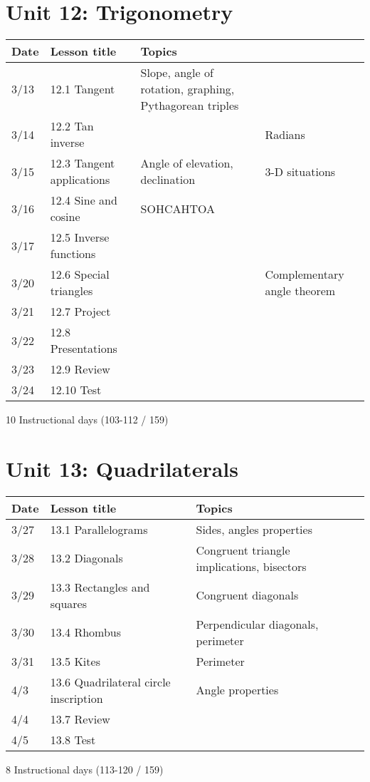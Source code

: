 \section*{Unit 12: Trigonometry}
\begin{tabular}{|p{0.9cm}|p{4cm}|p{7cm}|p{5cm}|}
  \hline
  Date & Lesson title & Topics  &  \\
  \hline
  3/13 & 12.1 Tangent & Slope, angle of rotation, graphing, Pythagorean triples &  \\
  \hline
  3/14 & 12.2 Tan inverse &  & Radians \\
  \hline
  3/15 & 12.3 Tangent applications & Angle of elevation, declination & 3-D situations \\
  \hline
  3/16 & 12.4 Sine and cosine & SOHCAHTOA &  \\
  \hline
  3/17 & 12.5 Inverse functions &  &  \\
  \hline
  3/20 & 12.6 Special triangles &  & Complementary angle theorem \\
  \hline
  3/21 & 12.7 Project &  &  \\
  \hline
  3/22 & 12.8 Presentations &  &  \\
  \hline
  3/23 & 12.9 Review &  &  \\
  \hline
  3/24 & 12.10 Test &  &  \\
  \hline

\end{tabular} \par \vspace*{0.3cm}
10 Instructional days (103-112 / 159)


\section*{Unit 13: Quadrilaterals}
\begin{tabular}{|p{0.9cm}|p{4cm}|p{7cm}|p{5cm}|}
  \hline
  Date & Lesson title & Topics  &  \\
  \hline
  3/27 & 13.1 Parallelograms & Sides, angles properties &  \\
  \hline
  3/28 & 13.2 Diagonals & Congruent triangle implications, bisectors &  \\
  \hline
  3/29 & 13.3 Rectangles and squares & Congruent diagonals &  \\
  \hline
  3/30 & 13.4 Rhombus & Perpendicular diagonals, perimeter &  \\
  \hline
  3/31 & 13.5 Kites & Perimeter &  \\
  \hline
  4/3 & 13.6 Quadrilateral circle inscription & Angle properties & \\
  \hline
  4/4 & 13.7 Review &  &  \\
  \hline
  4/5 & 13.8 Test &  &  \\
  \hline

\end{tabular} \par \vspace*{0.3cm}
8 Instructional days (113-120 / 159)


